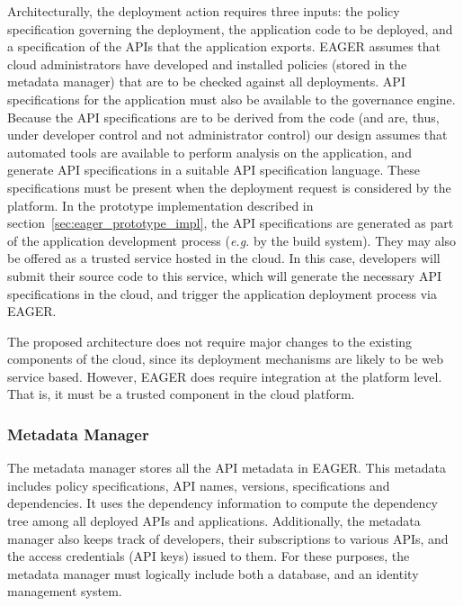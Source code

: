 Architecturally, the deployment action requires three inputs: the policy
specification governing the deployment, the application code to be deployed, and a
specification of the APIs that the application exports.
EAGER assumes that cloud administrators have developed and installed policies
(stored in the metadata manager)
that are to be checked against all deployments.  API specifications for the
application must also be available to the governance engine.  Because the API
specifications are to be derived from the code (and are, thus, under developer
control and not administrator control) our design assumes that automated
tools are available
to perform analysis on the application, and
generate API specifications in a suitable API specification language. These
specifications must be present
when the deployment request is considered by the platform.  In the prototype
implementation described in section~\ref{sec:eager_prototype_impl}, the API specifications are
generated as part of the application development process ({\em e.g.} by the
build system).  They may also
be offered as a trusted service hosted in the cloud. 
In this case, developers will submit their source code
to this service, which will generate the necessary API specifications in the cloud, and trigger
the application deployment process via EAGER.

The proposed architecture does not require major changes to the 
existing components of the cloud, since its deployment mechanisms are likely to
be web service based.  However, EAGER does require integration at the platform level.
That is, it must be a trusted component in the cloud platform. 

\subsubsection{Metadata Manager}
The metadata manager stores all the API metadata in EAGER. This metadata 
includes policy specifications,  API names, versions, specifications and 
dependencies.
It uses the dependency information to compute the dependency tree 
among 
all deployed APIs and applications. Additionally, the metadata manager
also keeps track of developers, their subscriptions to various APIs, 
and the access credentials (API keys) issued to them. 
For these purposes,
the metadata manager must logically include both a database,
and an identity management system.

